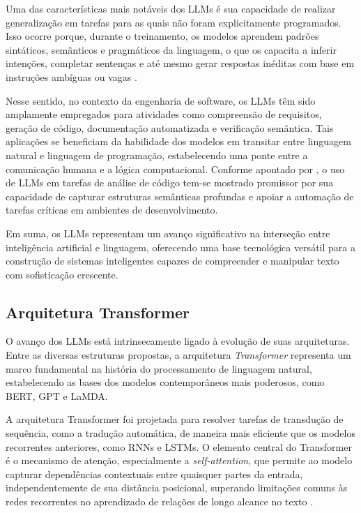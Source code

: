 Uma das características mais notáveis dos LLMs é sua capacidade de realizar generalização em tarefas para as quais não foram explicitamente programados. Isso ocorre porque, durante o treinamento, os modelos aprendem padrões sintáticos, semânticos e pragmáticos da linguagem, o que os capacita a inferir intenções, completar sentenças e até mesmo gerar respostas inéditas com base em instruções ambíguas ou vagas \cite{liu2024hallucinations, fan2023llmsw}.

Nesse sentido, no contexto da engenharia de software, os LLMs têm sido amplamente empregados para atividades como compreensão de requisitos, geração de código, documentação automatizada e verificação semântica. Tais aplicações se beneficiam da habilidade dos modelos em transitar entre linguagem natural e linguagem de programação, estabelecendo uma ponte entre a comunicação humana e a lógica computacional. Conforme apontado por , o uso de LLMs em tarefas de análise de código tem-se mostrado promissor por sua capacidade de capturar estruturas semânticas profundas e apoiar a automação de tarefas críticas em ambientes de desenvolvimento.

Em suma, os LLMs representam um avanço significativo na interseção entre inteligência artificial e linguagem, oferecendo uma base tecnológica versátil para a construção de sistemas inteligentes capazes de compreender e manipular texto com sofisticação crescente.

\subsection{Arquitetura Transformer}

O avanço dos LLMs está intrinsecamente ligado à evolução de suas arquiteturas. Entre as diversas estruturas propostas, a arquitetura \textit{Transformer} representa um marco fundamental na história do processamento de linguagem natural, estabelecendo as bases dos modelos contemporâneos mais poderosos, como BERT, GPT e LaMDA.

A arquitetura Transformer foi projetada para resolver tarefas de transdução de sequência, como a tradução automática, de maneira mais eficiente que os modelos recorrentes anteriores, como RNNs e LSTMs. O elemento central do Transformer é o mecanismo de atenção, especialmente a \textit{self-attention}, que permite ao modelo capturar dependências contextuais entre quaisquer partes da entrada, independentemente de sua distância posicional, superando limitações comuns às redes recorrentes no aprendizado de relações de longo alcance no texto \cite{vaswani2017}.

